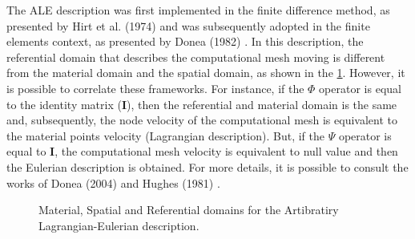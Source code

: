 \medskip
The ALE description was first implemented in the finite difference
 method, as presented by Hirt et al. (1974) \cite{hirt1974} 
and was subsequently adopted in the finite elements context, 
as presented by Donea (1982) \cite{donea1982}. In this description, 
the referential domain that describes the computational mesh moving 
is different from the material domain and the spatial domain, 
as shown in the \ref{referential domain}. 
However, it is possible to correlate these 
frameworks. For instance, if the $\Phi$ operator is equal to the 
identity matrix (\textbf{I}), then the referential and material domain 
is the same and, subsequently, the node velocity of the 
computational mesh 
is equivalent to the material points velocity (Lagrangian description). 
But, if the $\Psi$ operator is equal to \textbf{I}, the computational mesh
velocity is equivalent to null value and then the Eulerian description is
obtained. For more details, it is possible to consult the works 
of Donea (2004) \cite{donea2004} and Hughes (1981) \cite{hughes1981}.

\begin{figure}[H]
\begin{center}
\end{center}
\caption{
Material, Spatial and Referential domains for the Artibratiry Lagrangian-Eulerian description.
}
\label{referential domain}
\end{figure}




